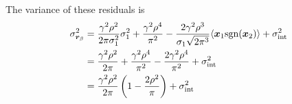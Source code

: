The variance of these residuals is
\begin{align*}
    \sigma_{\bm{r}_\beta}^2 &= \frac{\gamma^2\rho^2}{2\pi\sigma_1^2}\sigma_1^2 + \frac{\gamma^2\rho^4}{\pi^2} - \frac{2\gamma^2\rho^3}{\sigma_1\sqrt{2\pi^3}}\langle\bm{x}_1\text{sgn}(\bm{x}_2)\rangle + \sigma_{\text{int}}^2\\
    &= \frac{\gamma^2\rho^2}{2\pi} + \frac{\gamma^2\rho^4}{\pi^2} - \frac{2\gamma^2\rho^4}{\pi^2} + \sigma_{\text{int}}^2\\
    &= \frac{\gamma^2\rho^2}{2\pi}\left(1-\frac{2\rho^2}{\pi}\right) + \sigma_{\text{int}}^2
\end{align*}


